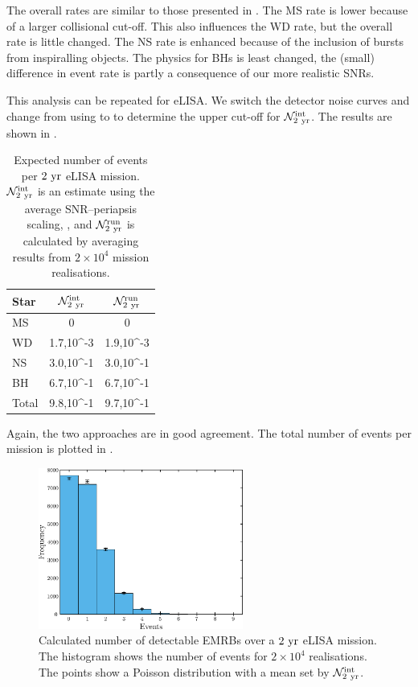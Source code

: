 The overall rates are similar to those presented in \citet{Hopman2007}. The MS rate is lower because of a larger collisional cut-off. This also influences the WD rate, but the overall rate is little changed. The NS rate is enhanced because of the inclusion of bursts from inspiralling objects. The physics for BHs is least changed, the (small) difference in event rate is partly a consequence of our more realistic SNRs.

This analysis can be repeated for eLISA. We switch the detector noise curves and change from using  to  to determine the upper cut-off for $\mathcal{N}_{2~\mathrm{yr}}^\mathrm{int}$. The results are shown in .
\begin{table}\footnotesize
\centering
  \begin{tabular}{l D{,}{\,\times\,}{3.4} D{,}{\,\times\,}{3.4}}
  \toprule
  Star &  &  \\ \midrule
  MS &  &  \\
  WD & 1.7,10^{-3} & 1.9,10^{-3} \\
  NS & 3.0,10^{-1} & 3.0,10^{-1}  \\
  BH & 6.7,10^{-1} & 6.7,10^{-1} \\
  \midrule
  Total & 9.8,10^{-1} & 9.7,10^{-1} \\
  \bottomrule
\end{tabular}
  \caption{Expected number of events per $2~\mathrm{yr}$ eLISA mission. $\mathcal{N}_{2~\mathrm{yr}}^\mathrm{int}$ is an estimate using the average SNR--periapsis scaling, , and $\mathcal{N}_{2~\mathrm{yr}}^\mathrm{run}$ is calculated by averaging results from $2 \times 10^4$ mission realisations.}\label{tab:eLISA-Rates}
\end{table}
Again, the two approaches are in good agreement. The total number of events per mission is plotted in .
\begin{figure}%
\centering
   \includegraphics[width=0.6\textwidth]{./images/Fig_Total_event_hist_eLISA}
\caption{Calculated number of detectable EMRBs over a $2~\mathrm{yr}$ eLISA mission. The histogram shows the number of events for $2 \times 10^4$ realisations. The points show a Poisson distribution with a mean set by $\mathcal{N}_{2~\mathrm{yr}}^\mathrm{int}$.}
\label{fig:eLISA-Event-no}
\end{figure}
